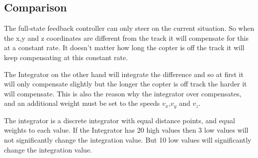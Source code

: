 \subsection{Comparison}
The full-state feedback controller can only steer on the current situation. So when the x,y and z coordinates are different from the track it will compensate for this at a constant rate. It doesn't matter how long the copter is off the track it will keep compensating at this constant rate. 

The Integrator on the other hand will integrate the difference and so at first it will only compensate slightly but the longer the copter is off track the harder it will compensate. This is also the reason why the integrator over compensates, and an additional weight must be set to the speeds $v_x$,$v_y$ and $v_z$.

The integrator is a discrete integrator with equal distance points, and equal weights to each value. If the Integrator has 20 high values then 3 low values will not significantly change the integration value. But 10 low values will significantly change the integration value.
